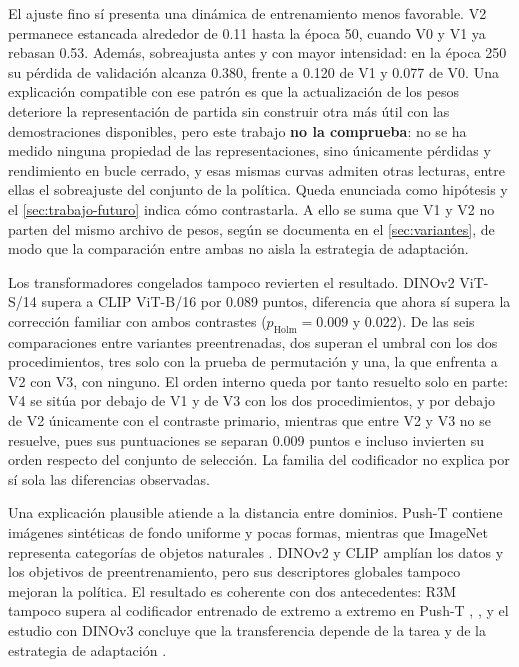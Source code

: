 El ajuste fino s\'i presenta una din\'amica de entrenamiento menos favorable.
V2 permanece estancada alrededor de \num{0.11} hasta la \'epoca \num{50}, cuando V0 y V1
ya rebasan \num{0.53}. Adem\'as, sobreajusta antes y con mayor intensidad: en la \'epoca
\num{250} su p\'erdida de validaci\'on alcanza \num{0.380}, frente a \num{0.120} de V1 y
\num{0.077} de V0. Una explicaci\'on compatible con ese patr\'on es que la actualizaci\'on
de los pesos deteriore la representaci\'on de partida sin construir otra m\'as \'util con
las demostraciones disponibles, pero este trabajo \textbf{no la comprueba}: no se ha
medido ninguna propiedad de las representaciones, sino \'unicamente p\'erdidas y
rendimiento en bucle cerrado, y esas mismas curvas admiten otras lecturas, entre ellas el
sobreajuste del conjunto de la pol\'itica. Queda enunciada como hip\'otesis y el
\cref{sec:trabajo-futuro} indica c\'omo contrastarla. A ello se suma que V1 y V2 no parten
del mismo archivo de pesos, seg\'un se documenta en el \cref{sec:variantes}, de modo que la
comparaci\'on entre ambas no aisla la estrategia de adaptaci\'on.

Los transformadores congelados tampoco revierten el resultado. DINOv2 ViT-S/14 supera a
CLIP ViT-B/16 por \num{0.089} puntos, diferencia que ahora s\'i supera la correcci\'on
familiar con ambos contrastes ($p_{\mathrm{Holm}} = \num{0.009}$ y \num{0.022}). De las seis
comparaciones entre variantes preentrenadas, dos superan el umbral con los dos
procedimientos, tres solo con la prueba de permutaci\'on y una, la que enfrenta a V2 con V3,
con ninguno. El orden interno queda por tanto resuelto solo en parte: V4 se sit\'ua por
debajo de V1 y de V3 con los dos procedimientos, y por debajo de V2 \'unicamente con el
contraste primario, mientras que entre V2 y V3 no se resuelve, pues sus puntuaciones se
separan \num{0.009} puntos e incluso invierten su orden respecto del conjunto de
selecci\'on. La familia del codificador no explica por s\'i sola las diferencias
observadas.

Una explicaci\'on plausible atiende a la distancia entre dominios. Push-T contiene
im\'agenes sint\'eticas de fondo uniforme y pocas formas, mientras que ImageNet representa
categor\'ias de objetos naturales \cite{deng2009imagenet}. DINOv2 y CLIP ampl\'ian los datos
y los objetivos de preentrenamiento, pero sus descriptores globales tampoco mejoran la
pol\'itica. El resultado es coherente con dos antecedentes: R3M tampoco supera al
codificador entrenado de extremo a extremo en Push-T \cite{nair2022r3m},
\cite{chi2025diffusion}, y el estudio con DINOv3 concluye que la transferencia depende de
la tarea y de la estrategia de adaptaci\'on \cite{egbe2025dinov3dp}.

